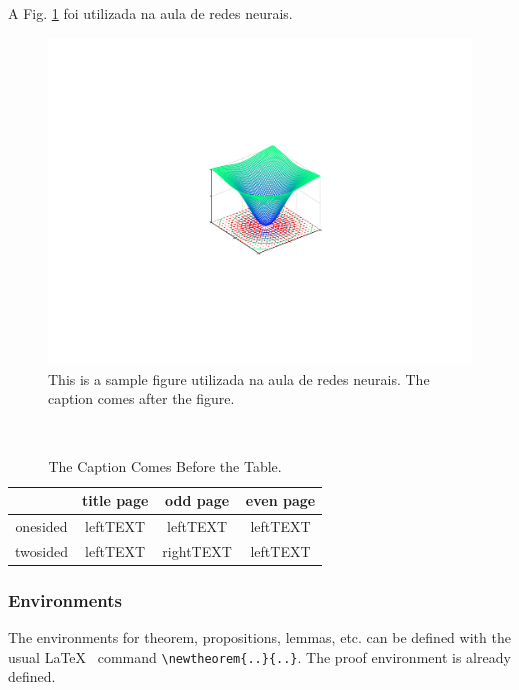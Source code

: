 \documentclass[journal,transmag]{IEEEtran}
\begin{document}
A Fig. \ref{fg:gradiente_matlab} foi utilizada na aula de redes neurais.

\begin{figure}[htb!]%
\begin{center}
    \includegraphics[scale = 0.9, trim = 107.0mm 73.0mm 100.0mm 70.0mm,clip]{Gradiente_Matlab.pdf}
    \caption{This is a sample figure utilizada na aula de redes neurais. The caption comes after the figure.}
    \label{fg:gradiente_matlab} %
\end{center}
\end{figure}

\begin{table}[htb]
\caption{The Caption Comes Before the Table.}
\begin{center}
{\tt
\begin{tabular}{|c||c|c|c|}\hline
&title page&odd page&even page\\\hline\hline
onesided&leftTEXT&leftTEXT&leftTEXT\\\hline
twosided&leftTEXT&rightTEXT&leftTEXT\\\hline
\end{tabular}
}
\end{center}
\end{table}

\subsubsection{Environments}
The environments for theorem, propositions, lemmas, etc. can be
defined with the usual \LaTeX\ \cite{LaTeX,LaTeXD} command
\verb+\newtheorem{..}{..}+.  The proof environment is already defined.
\end{document}
